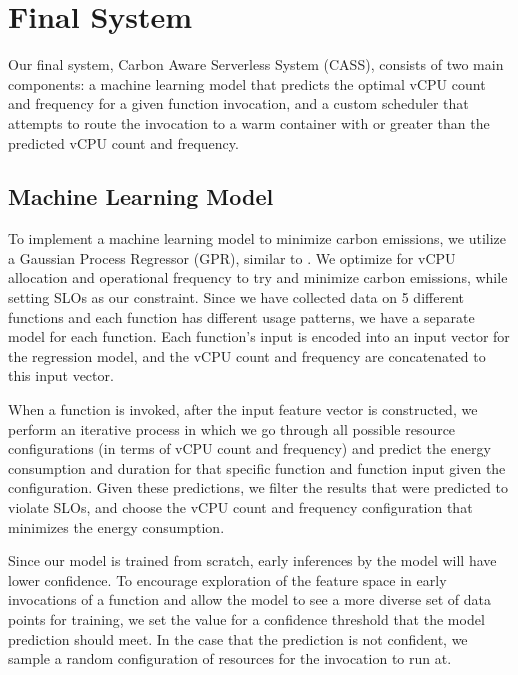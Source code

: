\documentclass[times, 10pt,twocolumn]{article}
\begin{document}




\section{Final System}

Our final system, Carbon Aware Serverless System (CASS), consists of two main components: a machine learning model that predicts the optimal vCPU count and frequency for a given function invocation, and a custom scheduler that attempts to route the invocation to a warm container with or greater than the predicted vCPU count and frequency.

\subsection{Machine Learning Model}
To implement a machine learning model to minimize carbon emissions, we utilize a Gaussian Process Regressor (GPR), similar to \cite{aquatope}. We optimize for vCPU allocation and operational frequency to try and minimize carbon emissions, while setting SLOs as our constraint. Since we have collected data on 5 different functions and each function has different usage patterns, we have a separate model for each function. Each function's input is encoded into an input vector for the regression model, and the vCPU count and frequency are concatenated to this input vector.

When a function is invoked, after the input feature vector is constructed, we perform an iterative process in which we go through all possible resource configurations (in terms of vCPU count and frequency) and predict the energy consumption and duration for that specific function and function input given the configuration. Given these predictions, we filter the results that were predicted to violate SLOs, and choose the vCPU count and frequency configuration that minimizes the energy consumption. 

Since our model is trained from scratch, early inferences by the model will have lower confidence. To encourage exploration of the feature space in early invocations of a function and allow the model to see a more diverse set of data points for training, we set the value for a confidence threshold that the model prediction should meet. In the case that the prediction is not confident, we sample a random configuration of resources for the invocation to run at. 
\end{document}
